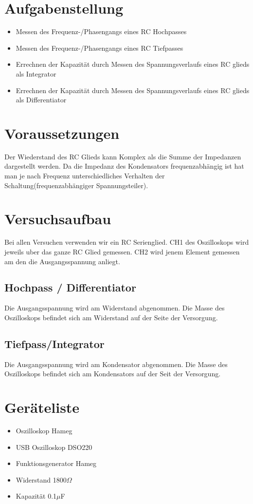 \documentclass[a4paper]{article}
\begin{document}
\section{Aufgabenstellung}
\begin{itemize}
  \item Messen des Frequenz-/Phasengangs eines RC Hochpasses
  \item Messen des Frequenz-/Phasengangs eines RC Tiefpasses
  \item Errechnen der Kapazität durch Messen des Spannungsverlaufs eines RC glieds als Integrator
  \item Errechnen der Kapazität durch Messen des Spannungsverlaufs eines RC glieds als Differentiator
\end{itemize}

\section{Voraussetzungen}
  Der Wiederstand des RC Glieds kann Komplex als die Summe der Impedanzen dargestellt werden. Da die Impedanz des Kondensators frequenzabhängig ist hat man je nach Frequenz unterschiedliches Verhalten der Schaltung(frequenzabhängiger Spannungsteiler). 

\section{Versuchsaufbau}
Bei allen Versuchen verwenden wir ein RC Serienglied.
CH1 des Oszilloskops wird jeweils uber das ganze RC Glied gemessen.
CH2 wird jenem Element gemessen am den die Ausgangsspannung anliegt.
\subsection{Hochpass / Differentiator}
  Die Ausgangsspannung wird am Widerstand abgenommen. Die Masse des Oszilloskops befindet sich am Widerstand auf der Seite der Versorgung.
\subsection{Tiefpass/Integrator}
  Die Ausgangsspannung wird am Kondensator abgenommen. Die Masse des Oszilloskops befindet sich am Kondensators auf der Seit der Versorgung.

\section{Geräteliste}
\begin{itemize}
  \item Oszilloskop Hameg
  \item USB Oszilloskop DSO220
  \item Funktionsgenerator Hameg
  \item Widerstand 1800$\Omega$
  \item Kapazität 0.1$\mu$F
\end{itemize}
\end{document}
